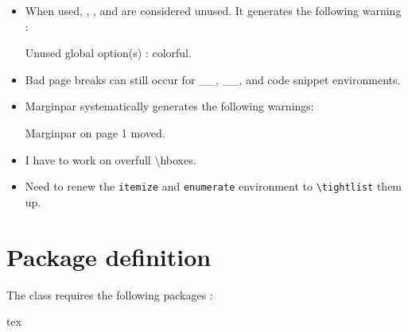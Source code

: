 \documentclass[
	raggedright,
	twoside,
	12pt,
	colorful,
]{tufte-style-article}
\begin{document}
\begin{itemize}\tightlist
\item When used, , , and  are considered unused. It generates the following warning :
\begin{codebox}{}
Unused global option(s) : colorful.
\end{codebox}
\item Bad page breaks can still occur for _\textfig{}_, _\widefig{}_, and code snippet environments.
\item Marginpar systematically generates the following warnings:
\begin{codebox}{}
Marginpar on page 1 moved.
\end{codebox}
\item I have to work on overfull \textbackslash hboxes.
\item Need to renew the \texttt{itemize} and \texttt{enumerate} environment to \texttt{\textbackslash tightlist} them up.
\end{itemize}


\section{Package definition}

The class requires the following packages :
\begin{codebox}{tex}
%
\RequirePackage{geometry}		%
\RequirePackage{emptypage}		%
\RequirePackage{fullwidth}		%
\RequirePackage{sidenotes}		%
\RequirePackage[
	hypcap=false				%
]{caption}						%
\RequirePackage[T1]{fontenc}	%
\RequirePackage[osf]{libertinus}%
\RequirePackage{libertinust1math}
\RequirePackage{gillius}		%
\if@sans
\fi
\RequirePackage[
	defaultmono,
	scale=.86
]{droidsansmono}				%
\RequirePackage{ragged2e}		%
\RequirePackage{titlesec}		%
\RequirePackage{titletoc}		%
\RequirePackage{fancyhdr}		%
\RequirePackage{graphicx}		%
\RequirePackage[
	protrusion=true,
	expansion=true,
	final,
	tracking,
]{microtype}					%
\RequirePackage{amsfonts}		%
\RequirePackage{amsmath}		%
\RequirePackage{mathtools}		%
\RequirePackage{physics}		%
\RequirePackage{minted} 		%
\RequirePackage{xcolor}			%
\RequirePackage[framemethod=TikZ]{mdframed} %
\RequirePackage{tabularx}		%
\RequirePackage{booktabs}		%
\RequirePackage{enumitem}		%
\RequirePackage[hidelinks]{hyperref}	%
\RequirePackage{etoolbox}		%
\RequirePackage{verbatim}   	%
\end{codebox}
\end{document}
